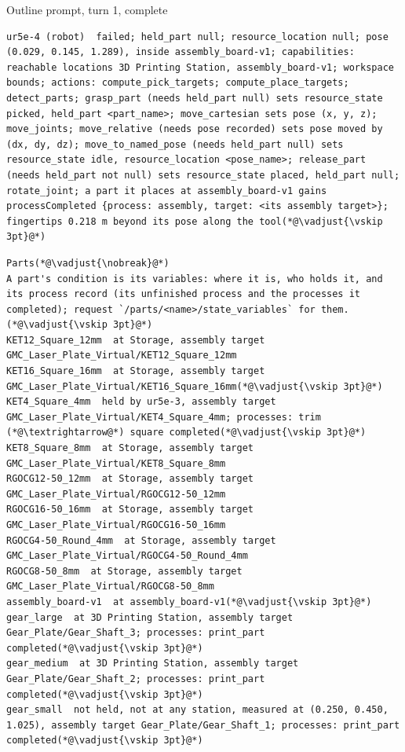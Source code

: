 \documentclass[preprint,12pt,authoryear]{elsarticle}
\begin{document}
\begin{fullbox}{Outline prompt, turn 1, complete}
\begin{lstlisting}[showlines=true]
ur5e-4 (robot)  failed; held_part null; resource_location null; pose (0.029, 0.145, 1.289), inside assembly_board-v1; capabilities: reachable locations 3D Printing Station, assembly_board-v1; workspace bounds; actions: compute_pick_targets; compute_place_targets; detect_parts; grasp_part (needs held_part null) sets resource_state picked, held_part <part_name>; move_cartesian sets pose (x, y, z); move_joints; move_relative (needs pose recorded) sets pose moved by (dx, dy, dz); move_to_named_pose (needs held_part null) sets resource_state idle, resource_location <pose_name>; release_part (needs held_part not null) sets resource_state placed, held_part null; rotate_joint; a part it places at assembly_board-v1 gains processCompleted {process: assembly, target: <its assembly target>}; fingertips 0.218 m beyond its pose along the tool(*@\vadjust{\vskip 3pt}@*)

\end{lstlisting}
\begin{minipage}{\linewidth}
\begin{lstlisting}
Parts(*@\vadjust{\nobreak}@*)
A part's condition is its variables: where it is, who holds it, and its process record (its unfinished process and the processes it completed); request `/parts/<name>/state_variables` for them.(*@\vadjust{\vskip 3pt}@*)
KET12_Square_12mm  at Storage, assembly target GMC_Laser_Plate_Virtual/KET12_Square_12mm
KET16_Square_16mm  at Storage, assembly target GMC_Laser_Plate_Virtual/KET16_Square_16mm(*@\vadjust{\vskip 3pt}@*)
KET4_Square_4mm  held by ur5e-3, assembly target GMC_Laser_Plate_Virtual/KET4_Square_4mm; processes: trim (*@\textrightarrow@*) square completed(*@\vadjust{\vskip 3pt}@*)
KET8_Square_8mm  at Storage, assembly target GMC_Laser_Plate_Virtual/KET8_Square_8mm
RGOCG12-50_12mm  at Storage, assembly target GMC_Laser_Plate_Virtual/RGOCG12-50_12mm
RGOCG16-50_16mm  at Storage, assembly target GMC_Laser_Plate_Virtual/RGOCG16-50_16mm
RGOCG4-50_Round_4mm  at Storage, assembly target GMC_Laser_Plate_Virtual/RGOCG4-50_Round_4mm
RGOCG8-50_8mm  at Storage, assembly target GMC_Laser_Plate_Virtual/RGOCG8-50_8mm
assembly_board-v1  at assembly_board-v1(*@\vadjust{\vskip 3pt}@*)
gear_large  at 3D Printing Station, assembly target Gear_Plate/Gear_Shaft_3; processes: print_part completed(*@\vadjust{\vskip 3pt}@*)
gear_medium  at 3D Printing Station, assembly target Gear_Plate/Gear_Shaft_2; processes: print_part completed(*@\vadjust{\vskip 3pt}@*)
gear_small  not held, not at any station, measured at (0.250, 0.450, 1.025), assembly target Gear_Plate/Gear_Shaft_1; processes: print_part completed(*@\vadjust{\vskip 3pt}@*)
\end{lstlisting}
\end{minipage}
\end{fullbox}
\end{document}
